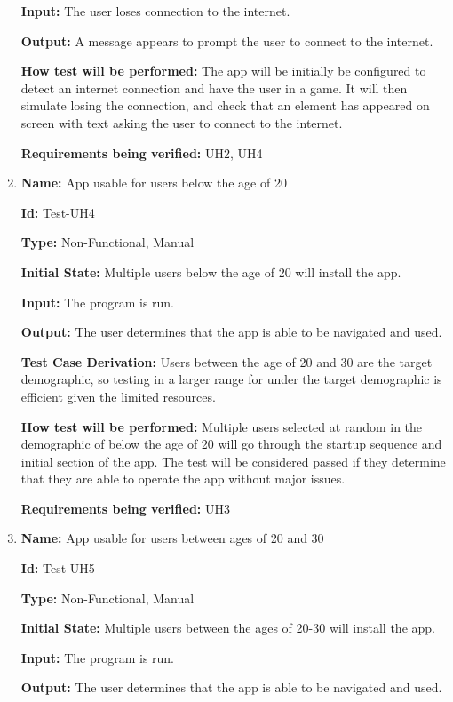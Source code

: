 \documentclass[12pt, titlepage]{article}
\begin{document}
\begin{enumerate}
\textbf{Input:} The user loses connection to the internet.
					
\textbf{Output:} A message appears to prompt the user to connect to the internet. 
					
\textbf{How test will be performed:} The app will be initially be configured to detect an internet connection and have the user in a game. It will then simulate losing the connection, and check that an element has appeared on screen with text asking the user to connect to the internet. 

\textbf{Requirements being verified:} UH2, UH4

\item{\textbf{Name:} App usable for users below the age of 20} \label{itm:Test-UH4}

\textbf{Id:} Test-UH4

\textbf{Type:} Non-Functional, Manual
					
\textbf{Initial State:} Multiple users below the age of 20 will install the app.
					
\textbf{Input:} The program is run.
					
\textbf{Output:} The user determines that the app is able to be navigated and used.

\textbf{Test Case Derivation:} Users between the age of 20 and 30 are the target demographic, so testing in a larger range for under the target demographic is efficient given the limited resources.  
					
\textbf{How test will be performed:} Multiple users selected at random in the demographic of below the age of 20 will go through the startup sequence and initial section of the app. The test will be considered passed if they determine that they are able to operate the app without major issues. 

\textbf{Requirements being verified:} UH3

\item{\textbf{Name:} App usable for users between ages of 20 and 30} \label{itm:Test-UH5}

\textbf{Id:} Test-UH5

\textbf{Type:} Non-Functional, Manual
					
\textbf{Initial State:} Multiple users between the ages of 20-30 will install the app.
					
\textbf{Input:} The program is run.
					
\textbf{Output:} The user determines that the app is able to be navigated and used.


\end{enumerate}
\end{document}
